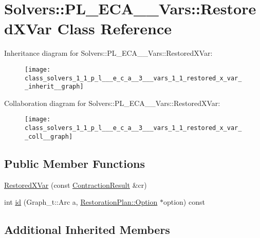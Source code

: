 \hypertarget{class_solvers_1_1_p_l___e_c_a__3___vars_1_1_restored_x_var}{}\section{Solvers\+:\+:P\+L\+\_\+\+E\+C\+A\+\_\+\_\+\+Vars\+:\+:Restored\+X\+Var Class Reference}
\label{class_solvers_1_1_p_l___e_c_a__3___vars_1_1_restored_x_var}


Inheritance diagram for Solvers\+:\+:P\+L\+\_\+\+E\+C\+A\+\_\+\_\+\+Vars\+:\+:Restored\+X\+Var\+:\nopagebreak
\begin{figure}[H]
\begin{center}
\leavevmode
\texttt{[image: class\_solvers\_1\_1\_p\_l\_\_\_e\_c\_a\_\_3\_\_\_vars\_1\_1\_restored\_x\_var\_\_inherit\_\_graph]}
\end{center}
\end{figure}


Collaboration diagram for Solvers\+:\+:P\+L\+\_\+\+E\+C\+A\+\_\+\_\+\+Vars\+:\+:Restored\+X\+Var\+:\nopagebreak
\begin{figure}[H]
\begin{center}
\leavevmode
\texttt{[image: class\_solvers\_1\_1\_p\_l\_\_\_e\_c\_a\_\_3\_\_\_vars\_1\_1\_restored\_x\_var\_\_coll\_\_graph]}
\end{center}
\end{figure}
\subsection*{Public Member Functions}
\begin{DoxyCompactItemize}
\item 
\hyperlink{class_solvers_1_1_p_l___e_c_a__3___vars_1_1_restored_x_var_a3dc06edea3e4cccd9b2500c9135fe3ff}{Restored\+X\+Var} (const \hyperlink{class_contraction_result}{Contraction\+Result} \&cr)
\item 
int \hyperlink{class_solvers_1_1_p_l___e_c_a__3___vars_1_1_restored_x_var_a5359b529bcc8e68b13acedb66b04553b}{id} (Graph\+\_\+t\+::\+Arc a, \hyperlink{class_restoration_plan_1_1_option}{Restoration\+Plan\+::\+Option} $\ast$option) const
\end{DoxyCompactItemize}
\subsection*{Additional Inherited Members}


